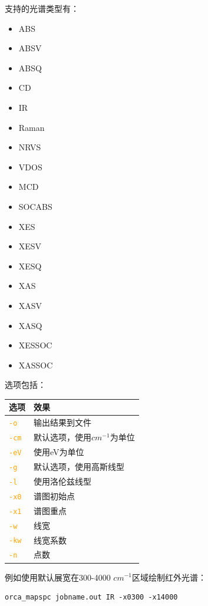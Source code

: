 \documentclass{ctexart}
\newcommand{\cmd}[1]{ \textcolor{orange}{\texttt{#1}} }
\begin{document}
	支持的光谱类型有：
	\begin{itemize}
		\item ABS	
		\item ABSV	
		\item ABSQ	
		\item CD	
		\item IR	
		\item Raman
		\item NRVS	
		\item VDOS	
		\item MCD	
		\item SOCABS	
		\item XES	
		\item XESV
		\item XESQ	
		\item XAS	
		\item XASV	
		\item XASQ	
		\item XESSOC	
		\item XASSOC
	\end{itemize}
	
	
	选项包括：
	
	\begin{table}[H]
		\centering
		\begin{tabular}{ll}
			\toprule
			\textbf{选项}    & \textbf{效果}                  \\
			\midrule
			\cmd{-o}  & 输出结果到文件             \\
			\cmd{-cm} & 默认选项，使用$cm^{-1}$为单位 \\
			\cmd{-eV} & 使用eV为单位             \\
			\cmd{-g}  & 默认选项，使用高斯线型         \\
			\cmd{-l}  & 使用洛伦兹线型             \\
			\cmd{-x0} & 谱图初始点               \\
			\cmd{-x1}& 谱图重点                \\
			\cmd{-w}  & 线宽                  \\
			\cmd{-kw} & 线宽系数                \\
			\cmd{-n}  & 点数           \\
			\midrule      
		\end{tabular}
	\end{table}
	
	例如使用默认展宽在300-4000 $cm^{-1}$区域绘制红外光谱：
	
	\begin{lstlisting}
orca_mapspc jobname.out IR -x0300 -x14000
	\end{lstlisting}
	
\end{document}
